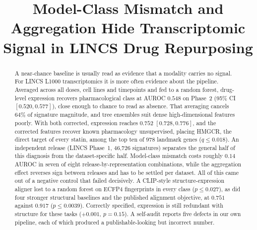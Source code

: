 \documentclass[conference]{IEEEtran}
\newif\ifanon
\begin{document}
\title{Model-Class Mismatch and Aggregation Hide Transcriptomic Signal in LINCS Drug Repurposing}

\ifanon
\author{\IEEEauthorblockN{Anonymous Author(s)}
\IEEEauthorblockA{\textit{Affiliation withheld for review}}}
\else
\author{
\and
{}
}
\fi

\maketitle

\begin{abstract}
A near-chance baseline is usually read as evidence that a modality carries no
signal. For LINCS L1000 transcriptomics it is more often evidence about the
pipeline. Averaged across all doses, cell lines and timepoints and fed to a
random forest, drug-level expression recovers pharmacological class at AUROC
$0.548$ on Phase~2 (95\% CI $[0.520, 0.577]$), close enough to chance to read as
absence. That averaging cancels $64\%$ of signature magnitude, and tree
ensembles suit dense high-dimensional features poorly. With both corrected,
expression reaches $0.752$ $[0.728, 0.776]$, and the corrected features recover
known pharmacology unsupervised, placing HMGCR, the direct target of every
statin, among the top ten of $978$ landmark genes ($q \le 0.018$). An independent
release (LINCS Phase~1, 46{,}726 signatures) separates the general half of this
diagnosis from the dataset-specific half. Model-class mismatch costs roughly
$0.14$ AUROC in seven of eight release-by-representation combinations, while the
aggregation effect reverses sign between releases and has to be settled per
dataset. All of this came out of a negative control that failed decisively. A
CLIP-style structure-expression aligner lost to a random forest on ECFP4
fingerprints in every class ($p \le 0.027$), as did four stronger structural
baselines and the published alignment objective, at $0.751$ against $0.917$
($p \le 0.0039$). Correctly specified, expression is still redundant with
structure for these tasks ($+0.001$, $p{=}0.15$). A self-audit reports five
defects in our own pipeline, each of which produced a publishable-looking but
incorrect number.
\end{abstract}
\end{document}
